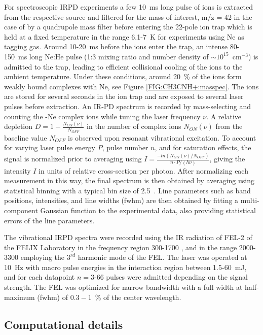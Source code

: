 For spectroscopic IRPD experiments a few 10~ms long pulse of ions is extracted from the respective source and filtered for the mass of interest, m/z = 42 in the case of \pa by a quadrupole mass filter before entering the 22-pole ion trap which is held at a fixed temperature in the range 6.1-7~K for experiments using Ne as tagging gas. Around 10-20~ms before the ions enter the trap, an intense 80-150~ms long Ne:He pulse (1:3 mixing ratio and number density of $\sim 10^{15}$~cm$^{-3}$) is admitted to the trap, leading to efficient collisional cooling of the ions to the ambient temperature. Under these conditions, { around 20~\% of the \pa ions form weakly bound complexes with Ne, see Figure \ref{FIG:CH3CNH+:masspec}.} The ions are stored for several seconds in the ion trap and are exposed to several laser pulses before extraction. An IR-PD spectrum is recorded by mass-selecting and counting the \pan-Ne complex ions while tuning the laser frequency $\nu$. A relative depletion $D=1-\frac{N_{ON}(\nu)}{N_{OFF}}$ in the number of complex ions $N_{ON}(\nu)$ from the baseline value $N_{OFF}$ is observed upon resonant vibrational excitation. To account for varying laser pulse energy $P$, pulse number $n$, and for saturation effects, the signal is normalized prior to averaging using $I=\frac{- ln(N_{ON}(\nu)/N_{OFF})}{n\cdot P/(h\nu)}$, giving the intensity $I$ in units of relative cross-section per photon. 
After normalizing each measurement in this way, the final spectrum is then obtained by averaging using statistical binning with a typical bin size of 2.5~\wn. Line parameters such as band positions, intensities, and line widths (fwhm) are then obtained by fitting a multi-component Gaussian function to the experimental data, also providing statistical errors of the line parameters.


The vibrational IRPD spectra were recorded using the IR radiation of FEL-2 of the FELIX Laboratory in the frequency region 300-1700 \wn, and in the range 2000-3300 \wnn employing the $3^{rd}$ harmonic mode of the FEL. The laser was operated at 10~Hz with macro pulse energies in the interaction region between 1.5-60~mJ, and for each datapoint $n=$3-66 pulses were admitted depending on the signal strength. The FEL was optimized for narrow bandwidth with a full width at half-maximum (fwhm) of $0.3-1$~\% of the center wavelength.\\

\subsection{Computational details} 

